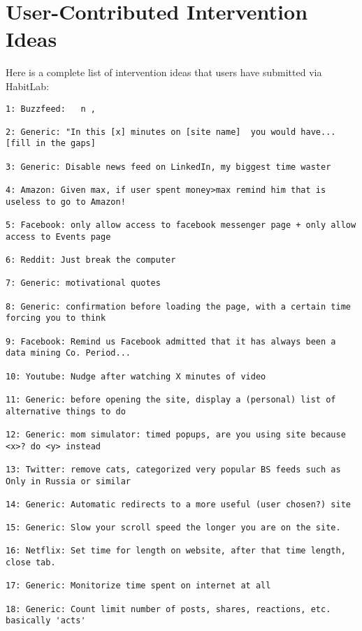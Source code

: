 \chapter{User-Contributed Intervention Ideas}
\label{ch:ideas}

Here is a complete list of intervention ideas that users have submitted via HabitLab:

\begin{lstlisting}[breaklines]
1: Buzzfeed:   n ,

2: Generic: "In this [x] minutes on [site name]  you would have... [fill in the gaps]

3: Generic: Disable news feed on LinkedIn, my biggest time waster

4: Amazon: Given max, if user spent money>max remind him that is useless to go to Amazon!

5: Facebook: only allow access to facebook messenger page + only allow access to Events page

6: Reddit: Just break the computer

7: Generic: motivational quotes

8: Generic: confirmation before loading the page, with a certain time forcing you to think

9: Facebook: Remind us Facebook admitted that it has always been a data mining Co. Period...

10: Youtube: Nudge after watching X minutes of video

11: Generic: before opening the site, display a (personal) list of alternative things to do

12: Generic: mom simulator: timed popups, are you using site because <x>? do <y> instead

13: Twitter: remove cats, categorized very popular BS feeds such as Only in Russia or similar

14: Generic: Automatic redirects to a more useful (user chosen?) site

15: Generic: Slow your scroll speed the longer you are on the site.

16: Netflix: Set time for length on website, after that time length, close tab.

17: Generic: Monitorize time spent on internet at all

18: Generic: Count limit number of posts, shares, reactions, etc. basically 'acts'


\end{lstlisting}

